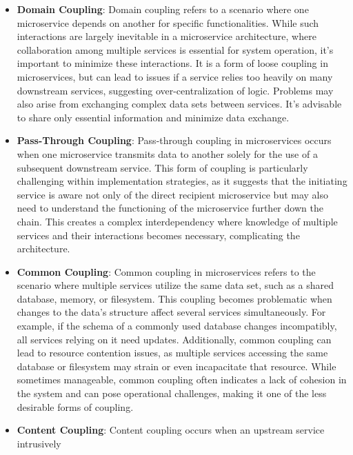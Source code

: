 \begin{itemize}
    \item \textbf{Domain Coupling}: Domain coupling refers to a scenario where one microservice
          depends on another for specific functionalities. While such interactions are largely inevitable
          in a microservice architecture, where collaboration among multiple services is essential for
          system operation, it's important to minimize these interactions. It is a form
          of loose coupling in microservices, but can lead to issues if a service relies too heavily on many
          downstream services, suggesting over-centralization of logic. Problems may also arise from
          exchanging complex data sets between services. It's advisable to share only essential
          information and minimize data exchange.
    \item \textbf{Pass-Through Coupling}: Pass-through coupling in microservices occurs when one
          microservice transmits data to another solely for the use of a subsequent downstream service.
          This form of coupling is particularly challenging within implementation strategies, as it
          suggests that the initiating service is aware not only of the direct recipient microservice but
          may also need to understand the functioning of the microservice further down the chain. This
          creates a complex interdependency where knowledge of multiple services and their interactions
          becomes necessary, complicating the architecture.
    \item \textbf{Common Coupling}: Common coupling in microservices refers to the scenario where
          multiple services utilize the same data set, such as a shared database, memory, or filesystem.
          This coupling becomes problematic when changes to the data's structure affect several services
          simultaneously. For example, if the schema of a commonly used database changes incompatibly, all
          services relying on it need updates. Additionally, common coupling can lead to resource
          contention issues, as multiple services accessing the same database or filesystem may strain or
          even incapacitate that resource. While sometimes manageable, common coupling often indicates a
          lack of cohesion in the system and can pose operational challenges, making it one of the less
          desirable forms of coupling.
    \item \textbf{Content Coupling}: Content coupling occurs when an upstream service intrusively

\end{itemize}
